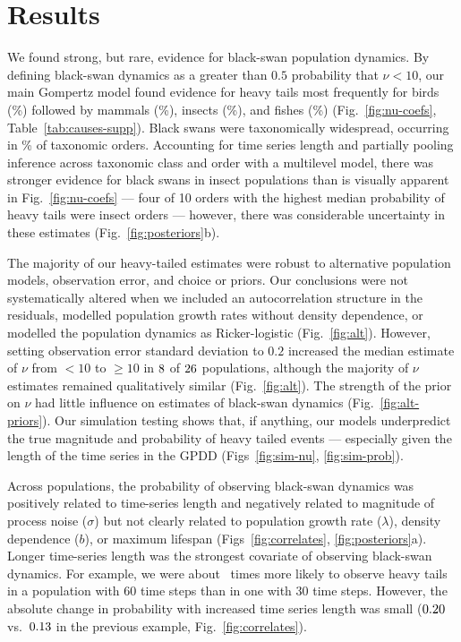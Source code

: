 \section{Results}

We found strong, but rare, evidence for black-swan population dynamics. By defining black-swan dynamics as a greater than $0.5$ probability that $\nu < 10$, our main Gompertz model found evidence for heavy tails most frequently for birds (\birdPH\%) followed by mammals (\mammalsPH\%), insects (\insectsPH\%), and fishes (\fishPH\%) (Fig.~\ref{fig:nu-coefs}, Table~\ref{tab:causes-supp}). Black swans were taxonomically widespread, occurring in \POrdersHeavy\% of taxonomic orders. Accounting for time series length and partially pooling inference across taxonomic class and order with a multilevel model, there was stronger evidence for black swans in insect populations than is visually apparent in Fig.~\ref{fig:nu-coefs} --- four of 10 orders with the highest median probability of heavy tails were insect orders --- however, there was considerable uncertainty in these estimates (Fig.~\ref{fig:posteriors}b).

The majority of our heavy-tailed estimates were robust to alternative population models, observation error, and choice or priors. Our conclusions were not systematically altered when we included an autocorrelation structure in the residuals, modelled population growth rates without density dependence, or modelled the population dynamics as Ricker-logistic (Fig.~\ref{fig:alt}). However, setting observation error standard deviation to $0.2$ increased the median estimate of $\nu$ from $<10$ to $\ge 10$ in $8$ of $26$ populations, although the majority of $\nu$ estimates remained qualitatively similar (Fig.~\ref{fig:alt}). The strength of the prior on $\nu$ had little influence on estimates of black-swan dynamics (Fig.~\ref{fig:alt-priors}). Our simulation testing shows that, if anything, our models underpredict the true magnitude and probability of heavy tailed events --- especially given the length of the time series in the GPDD (Figs~\ref{fig:sim-nu}, \ref{fig:sim-prob}).

Across populations, the probability of observing black-swan dynamics was positively related to time-series length and negatively related to magnitude of process noise ($\sigma$) but not clearly related to population growth rate ($\lambda$), density dependence ($b$), or maximum lifespan (Figs~\ref{fig:correlates}, \ref{fig:posteriors}a). Longer time-series length was the strongest covariate of observing black-swan dynamics. For example, we were about \pIncHeavyNThirtyNSixty~times more likely to observe heavy tails in a population with 60 time steps than in one with 30 time steps. However, the absolute change in probability with increased time series length was small ($0.20$ vs.\ $0.13$ in the previous example, Fig.~\ref{fig:correlates}).

